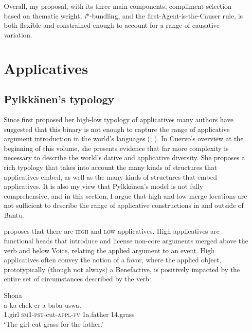 \documentclass[output=paper,modfonts,nonflat,colorlinks,citecolor=brown]{langsci/langscibook}
\begin{document}
Overall, my proposal, with its three main components, compliment selection based on thematic weight, \textit{i}*-bundling, and the first-Agent-is-the-Causer rule, is both flexible and constrained enough to account for a range of causative variation.

\section{Applicatives}\label{sec:wechsler:3}

\subsection{Pylkkänen’s typology}\label{sec:wechsler:3.1}

Since \citet{Pylkkänen2002} first proposed her high-low typology of applicatives many authors have suggested that this binary is not enough to capture the range of applicative argument introduction in the world’s languages (\citealt{Jeong2007,Peterson2007};  \citealt{GeorgalaEtAl2008,Cuervo2003, Cuervo2010born, Cuervo2012, Cuervo2015,Tsai2009,Kim2011thesis,Kim2012heads,Georgala2012}). In Cuervo’s overview at the beginning of this volume, she presents evidence that far more complexity is necessary to describe the world’s dative and applicative diversity. She proposes a rich typology that takes into account the many kinds of structures that applicatives embed, as well as the many kinds of structures that embed applicatives. It is also my view that Pylkkänen’s model is not fully comprehensive, and in this section, I argue that high and low merge locations are not sufficient to describe the range of applicative constructions in and outside of Bantu.


\citet{Pylkkänen2008} proposes that there are \textsc{high} and \textsc{low} applicatives. High applicatives are functional heads that introduce and license non-core arguments merged above the verb and below Voice, relating the applied argument to an event. High applicatives often convey the notion of a favor, where the applied object, prototypically (though not always) a Benefactive, is positively impacted by the entire set of circumstances described by the verb:


\ea\label{ex:wechsler:12}
Shona\\
 {a-ka-chek-er-a}                  {baba}  {uswa}.\\
1.girl     \textsc{sm1}{}-\textsc{pst}{}-cut-\textsc{appl-fv}   1a.father  14.grass\\
\glt ‘The girl cut grass for the father.'
\z
\end{document}
